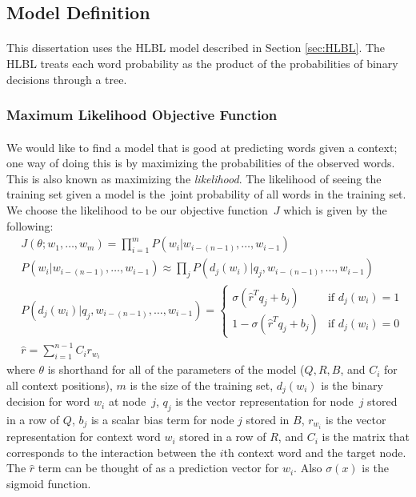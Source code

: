\subsection{Model Definition}
\paragraph{}
This dissertation uses the HLBL model described in Section \ref{sec:HLBL}. The HLBL treats each word probability as the product of the probabilities of binary decisions through a tree.

\subsubsection{Maximum Likelihood Objective Function}
\paragraph{}
We would like to find a model that is good at predicting words given a context; one way of doing this is by maximizing the probabilities of the observed words. This is also known as maximizing the \emph{likelihood}. The likelihood of seeing the training set given a model is the~joint probability of all words in the training set. We choose the likelihood to be our objective function~$J$ which is given by the following:
\begin{align}
&J(\theta;w_1,\dots, w_m) = \prod_{i=1}^{m} P(w_i | w_{i-(n-1)},\dots, w_{i-1}) \label{eq:likelihood}
\\
&P(w_i | w_{i-(n-1)},\dots, w_{i-1})  \approx \prod_j P(d_j(w_i) | q_j, w_{i-(n-1)},\dots, w_{i-1}) \label{eq:likelihoodDecisions}
\\ 
&P(d_j(w_i) | q_j, w_{i-(n-1)},\dots, w_{i-1}) =  
\begin{cases}
  \sigma( \hat{r}^T q_{j} +b_{j}) 	      & \text{if } d_j(w_i)  = 1 \\
 1- \sigma( \hat{r}^T q_{j} +b_{j})     & \text{if } d_j(w_i) = 0
  \end{cases} \nonumber
\\
&\hat{r} = \sum_{i=1}^{n-1} C_i r_{w_i} \nonumber
\end{align}
where $\theta$ is shorthand for all of the parameters of the model ($Q,R,B$, and $C_i$ for all context positions), $m$ is the size of the training set, $d_j(w_i)$ is the binary decision for word $w_i$ at node~$j$,  $q_j$ is the vector representation for node~$j$ stored in a row of $Q$, $b_{j}$ is a scalar bias term for node $j$ stored in $B$, $r_{w_i}$ is the vector representation for context word $w_i$ stored in a row of $R$, and $C_i$ is the matrix that corresponds to the interaction between the $i$th context word and the target node.  The $\hat{r}$ term can be thought of as a prediction vector for $w_i$. Also $\sigma(x)$ is the sigmoid function. 
